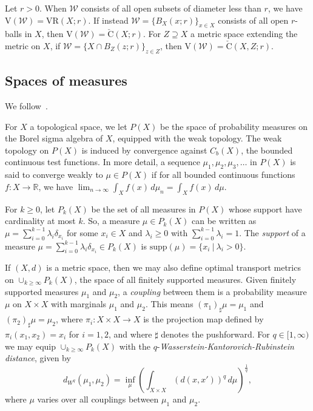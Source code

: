 \documentclass[11pt, reqno, english]{amsart}
\theoremstyle{plain}
\theoremstyle{definition}
\theoremstyle{myremark}
\newcommand{\R}{\mathbb{R}}
\newcommand{\cW}{\mathcal{W}}
\newcommand{\supp}{\mathrm{supp}}
\newcommand{\note}[1]{\textcolor{blue}{({#1})}}
\newcommand{\vr}[2]{\mathrm{VR}(#1;#2)}
\newcommand{\viet}[1]{\mathrm{V}(#1)}
\newcommand{\cech}[2]{\mathrm{\check{C}}(#1;#2)}
\newcommand{\acech}[3]{\mathrm{\check{C}}(#1,#2;#3)}
\begin{document}
Let $ r>0$.
When $\cW$ consists of all open subsets of diameter less than $r$, we have $\viet{\cW}=\vr{X}{r}$.
If instead $\cW=\{B_X(x;r)\}_{x\in X}$ consists of all open $r$-balls in $X$, then $\viet{\cW}=\cech{X}{r}$.
For $Z\supseteq X$ a metric space extending the metric on $X$, if $\cW=\{X\cap B_Z(z;r)\}_{z\in Z}$, then $\viet{\cW}=\acech{X}{Z}{r}$.


\subsection{Spaces of measures}

We follow~\cite{villani2008optimal,fedorchuk1991probability}.


For $X$ a topological space, we let $P(X)$ be the space of probability measures on the Borel sigma algebra of $X$, equipped with the weak topology.
The weak topology on $P(X)$ is induced by convergence against $C_b(X)$, the bounded continuous test functions.
In more detail, a sequence $\mu_1, \mu_2, \mu_3, \ldots$ in $P(X)$ is said to converge weakly to $\mu\in P(X)$ if for all bounded continuous functions $f\colon X\to \R$, we have $\lim_{n \to \infty} \int_X f(x)\,d\mu_n = \int_X f(x)\,d\mu$.

For $k\ge 0$, let $P_k(X)$ be the set of all measures in $P(X)$ whose support have cardinality at most $k$.
So, a measure $\mu \in P_k(X)$ can be written as $\mu=\sum_{i=0}^{k-1}\lambda_i \delta_{x_i}$ for some $x_i\in X$ and $\lambda_i \ge 0$ with $\sum_{i=0}^{k-1}\lambda_i=1$.
The \emph{support} of a measure $\mu = \sum_{i=0}^{k-1}\lambda_i \delta_{x_i} \in P_k(X)$ is $\supp(\mu)=\{x_i~|~\lambda_i>0\}$.

If $(X,d)$ is a metric space, then we may also define optimal transport metrics on $\cup_{k\ge \infty}P_k(X)$, the space of all finitely supported measures.
Given finitely supported measures $\mu_1$ and $\mu_2$, a \emph{coupling} between them is a probability measure $\mu$ on $X\times X$ with marginals $\mu_1$ and $\mu_2$.
This means $(\pi_1)_\sharp\mu=\mu_1$ and $(\pi_2)_\sharp \mu= \mu_2$, where $\pi_i\colon X\times X\to X$ is the projection map defined by $\pi_i(x_1,x_2)=x_i$ for $i=1,2$, and where $\sharp$ denotes the pushforward.
For $q\in[1,\infty)$ we may equip $\cup_{k\ge \infty}P_k(X)$ with the $q$-\emph{Wasserstein-Kantorovich-Rubinstein distance}, given by
\begin{equation}
d_{W^q}(\mu_1,\mu_2) = \inf_{\mu} \left(\int_{X\times X}(d(x,x'))^q\,d\mu\right)^{\frac{1}{q}},
\end{equation}
where $\mu$ varies over all couplings between $\mu_1$ and $\mu_2$.
\end{document}
